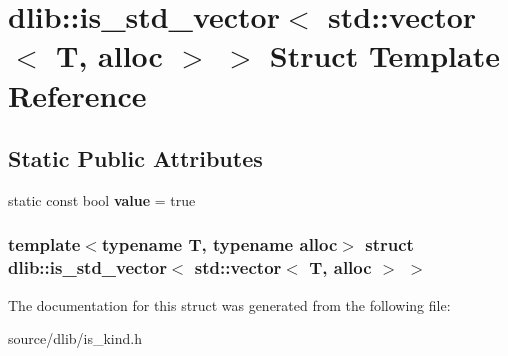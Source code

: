 \hypertarget{structdlib_1_1is__std__vector_3_01std_1_1vector_3_01T_00_01alloc_01_4_01_4}{
\section{dlib::is\_\-std\_\-vector$<$ std::vector$<$ T, alloc $>$ $>$ Struct Template Reference}
\label{structdlib_1_1is__std__vector_3_01std_1_1vector_3_01T_00_01alloc_01_4_01_4}
}
\subsection*{Static Public Attributes}
\begin{DoxyCompactItemize}
\item 
\hypertarget{structdlib_1_1is__std__vector_3_01std_1_1vector_3_01T_00_01alloc_01_4_01_4_a15a53bfa55e7761ee5193c2389597cdb}{
static const bool {\bfseries value} = true}
\label{structdlib_1_1is__std__vector_3_01std_1_1vector_3_01T_00_01alloc_01_4_01_4_a15a53bfa55e7761ee5193c2389597cdb}

\end{DoxyCompactItemize}
\subsubsection*{template$<$typename T, typename alloc$>$ struct dlib::is\_\-std\_\-vector$<$ std::vector$<$ T, alloc $>$ $>$}



The documentation for this struct was generated from the following file:\begin{DoxyCompactItemize}
\item 
source/dlib/is\_\-kind.h\end{DoxyCompactItemize}
